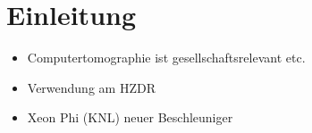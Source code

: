 \chapter{Einleitung}

\begin{itemize}
    \item Computertomographie ist gesellschaftsrelevant etc.
    \item Verwendung am HZDR
    \item Xeon Phi (KNL) neuer Beschleuniger
\end{itemize}


